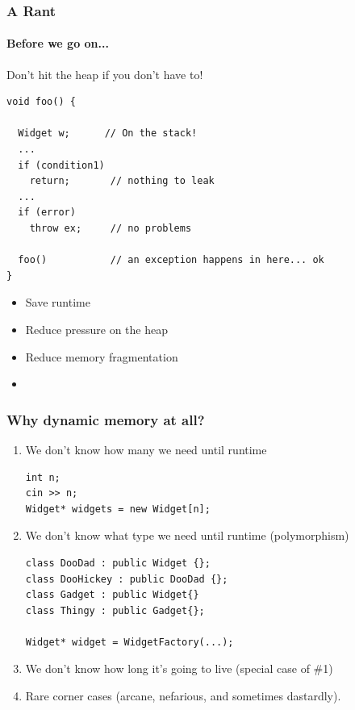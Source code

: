 \begin{frame}[fragile,t]
\frametitle{A Rant}
\framesubtitle{Before we go on...}
Don't hit the heap if you don't have to!

{\scriptsize \begin{verbatim}
void foo() {

  Widget w;      // On the stack!
  ...
  if (condition1)
    return;       // nothing to leak
  ...
  if (error)
    throw ex;     // no problems

  foo()           // an exception happens in here... ok
}
\end{verbatim}}
\pause{}
\begin{itemize}
\item Save runtime
\item Reduce pressure on the heap
\item Reduce memory fragmentation
\pause{}
\item {}
\end{itemize}

\end{frame}


\begin{frame}[fragile,t]
\frametitle{Why dynamic memory at all?}
\vskip 6pt
\pause{}

\begin{enumerate}
\item We don't know how many we need until runtime
{\scriptsize \begin{verbatim}
int n;
cin >> n;
Widget* widgets = new Widget[n];
\end{verbatim}
}
\pause{}
\item We don't know what type we need until runtime (polymorphism)
{\scriptsize \begin{verbatim}
class DooDad : public Widget {};
class DooHickey : public DooDad {};
class Gadget : public Widget{}
class Thingy : public Gadget{};

Widget* widget = WidgetFactory(...);
\end{verbatim}
}
\pause{}
\item We don't know how long it's going to live (special case of \#1)
\item Rare corner cases (arcane, nefarious, and sometimes dastardly).
\end{enumerate}

\vskip 12pt
\pause{}
\begin{center}
\end{center}
\end{frame}
